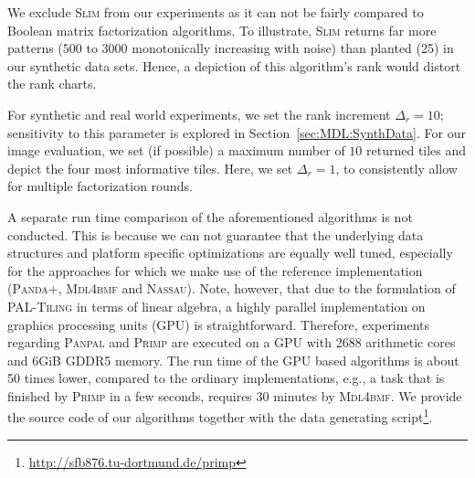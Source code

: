We exclude \textsc{Slim} from our experiments as it can not be fairly compared to Boolean matrix factorization algorithms. To illustrate, \textsc{Slim} returns far more patterns ($500$ to $3000$ monotonically increasing with noise) than planted (25) in our synthetic data sets. Hence, a depiction of this algorithm's rank would distort the rank charts.

For synthetic and real world experiments, we set the rank increment $\Delta_r=10$; sensitivity to this parameter is explored in Section~\ref{sec:MDL:SynthData}. For our image evaluation, we set (if possible) a maximum number of $10$ returned tiles and depict the four most informative tiles. Here, we set $\Delta_r=1$, to consistently allow for multiple factorization rounds. 

A separate run time comparison of the aforementioned algorithms is not conducted. This is because we can not guarantee that the underlying data structures and platform specific optimizations are equally well tuned, especially for the approaches for which we make use of the reference implementation (\textsc{Panda+}, \textsc{Mdl4bmf} and \textsc{Nassau}). Note, however, that due to the formulation of \textsc{PAL-Tiling} in terms of linear algebra, a highly parallel implementation on graphics processing units (GPU) is straightforward. Therefore, experiments regarding \textsc{Panpal} and \textsc{Primp} are executed on a GPU with 2688 arithmetic cores and 6GiB GDDR5 memory. The run time of the GPU based algorithms is about 50 times lower, compared to the ordinary implementations, e.g., a task that is finished by \textsc{Primp} in a few seconds, requires 30 minutes by \textsc{Mdl4bmf}. We provide the source code of our algorithms together with the data generating script\footnote{\url{http://sfb876.tu-dortmund.de/primp}}.
